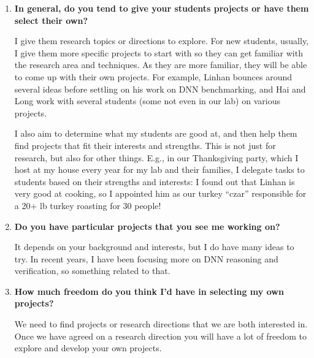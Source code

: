 \documentclass{article}
\begin{document}
\begin{enumerate}[label=\arabic*.]
    We are working on various software analysis projects, including formalizing and proving mathematical theorems, neural network verification and inference, analysis on highly-configurable software, and program testing, analysis, and repair. 

    Ok, cross out  --- I moved on from that. Nowadays I am more interested in DNN verification and reasoning and also using LLM-based proof assistants to formalize and prove mathematics.

    \item \textbf{In general, do you tend to give your students projects or have them select their own?}  
    
    I give them research topics or directions to explore. For new students, usually, I give them more specific projects to start with so they can get familiar with the research area and techniques. As they are more familiar, they will be able to come up with their own projects. For example, Linhan bounces around several ideas before settling on his work on DNN benchmarking, and Hai and Long work with several students (some not even in our lab) on various projects.
    
   I also aim to determine what my students are good at, and then help them find projects that fit their interests and strengths. This is not just for research, but also for other things. E.g., in our Thanksgiving party, which I host at my house every year for my lab and their families, I delegate tasks to students based on their strengths and interests: I found out that Linhan is very good at cooking, so I appointed him as our turkey ``czar'' responsible for a 20+ lb turkey roasting for 30 people!

 
    \item \textbf{Do you have particular projects that you see me working on?}  
    
    It depends on your background and interests, but I do have many ideas to try. In recent years, I have been focusing more on DNN reasoning and verification, so something related to that.   
    

    \item \textbf{How much freedom do you think I'd have in selecting my own projects?}  
    
    We need to find projects or research directions that we are both interested in. Once we have agreed on a research direction you will have a lot of freedom to explore and develop your own projects. 


\end{enumerate}
\end{document}
